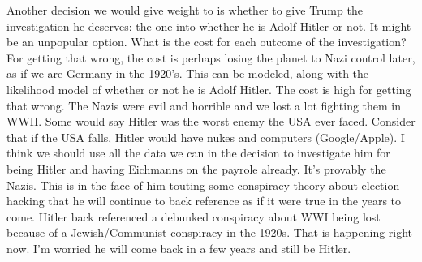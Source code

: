 \documentclass{article}
\begin{document}
\begin{multicols}{2}
Another decision we would give weight to is whether to give Trump the investigation he deserves: the one into whether he is Adolf Hitler or not. It might be an unpopular option. What is the cost for each outcome of the investigation? For getting that wrong, the cost is perhaps losing the planet to Nazi control later, as if we are Germany in the 1920's. This can be modeled, along with the likelihood model of whether or not he is Adolf Hitler. The cost is high for getting that wrong. The Nazis were evil and horrible and we lost a lot fighting them in WWII. Some would say Hitler was the worst enemy the USA ever faced. Consider that if the USA falls, Hitler would have nukes and computers (Google/Apple). I think we should use all the data we can in the decision to investigate him for being Hitler and having Eichmanns on the payrole already. It's provably the Nazis. This is in the face of him touting some conspiracy theory about election hacking that he will continue to back reference as if it were true in the years to come. Hitler back referenced a debunked conspiracy about WWI being lost because of a Jewish/Communist conspiracy in the 1920s. That is happening right now. I'm worried he will come back in a few years and still be Hitler.


\closearticle


\end{multicols}
\end{document}
